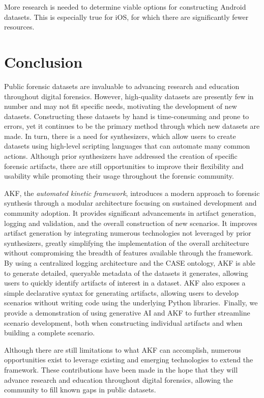 \documentclass[letterpaper,12pt]{report}
\begin{document}
More research is needed to determine viable options for constructing
Android datasets. This is especially true for iOS, for which there are
significantly fewer resources.

\chapter{Conclusion}\label{chapter-nine}

Public forensic datasets are invaluable to advancing research and
education throughout digital forensics. However, high-quality datasets
are presently few in number and may not fit specific needs, motivating
the development of new datasets. Constructing these datasets by hand is
time-consuming and prone to errors, yet it continues to be the primary
method through which new datasets are made. In turn, there is a need for
synthesizers, which allow users to create datasets using high-level
scripting languages that can automate many common actions. Although
prior synthesizers have addressed the creation of specific forensic
artifacts, there are still opportunities to improve their flexibility
and usability while promoting their usage throughout the forensic
community.

AKF, the \emph{automated kinetic framework}, introduces a modern
approach to forensic synthesis through a modular architecture focusing
on sustained development and community adoption. It provides significant
advancements in artifact generation, logging and validation, and the
overall construction of new scenarios. It improves artifact generation
by integrating numerous technologies not leveraged by prior
synthesizers, greatly simplifying the implementation of the overall
architecture without compromising the breadth of features available
through the framework. By using a centralized logging architecture and
the CASE ontology, AKF is able to generate detailed, queryable metadata
of the datasets it generates, allowing users to quickly identify
artifacts of interest in a dataset. AKF also exposes a simple
declarative syntax for generating artifacts, allowing users to develop
scenarios without writing code using the underlying Python
libraries.~Finally, we provide a demonstration of using generative AI
and AKF to further streamline scenario development, both when
constructing individual artifacts and when building a complete scenario.

Although there are still limitations to what AKF can accomplish,
numerous opportunities exist to leverage existing and emerging
technologies to extend the framework. These contributions have been made
in the hope that they will advance research and education throughout
digital forensics, allowing the community to fill known gaps in public
datasets.
\end{document}
